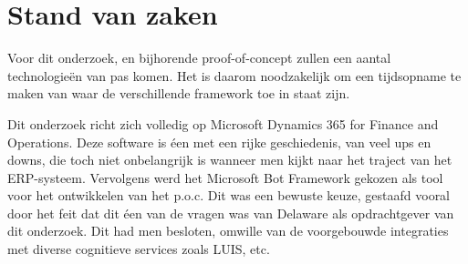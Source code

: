 \chapter{Stand van zaken}
\label{ch:stand-van-zaken}





Voor dit onderzoek, en bijhorende proof-of-concept zullen een aantal technologieën van pas komen. Het is daarom noodzakelijk om een tijdsopname te maken van waar de verschillende framework toe in staat zijn. 

Dit onderzoek richt zich volledig op Microsoft Dynamics 365 for Finance and Operations. Deze software is éen met een rijke geschiedenis, van veel ups en downs, die toch niet onbelangrijk is wanneer men kijkt naar het traject van het ERP-systeem. 
Vervolgens werd het Microsoft Bot Framework gekozen als tool voor het ontwikkelen van het p.o.c. Dit was een bewuste keuze, gestaafd vooral door het feit dat dit éen van de vragen was van Delaware als opdrachtgever van dit onderzoek. Dit had men besloten, omwille van de voorgebouwde integraties met diverse cognitieve services zoals LUIS, etc.

